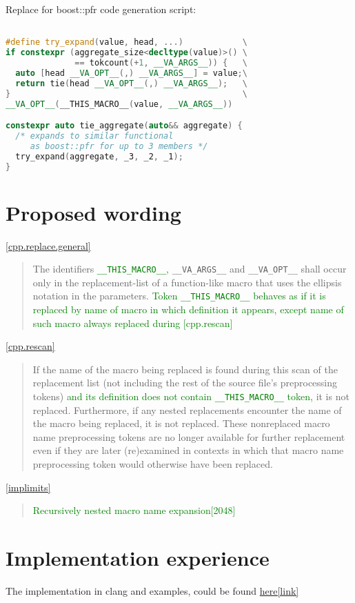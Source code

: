 \documentclass[12pt]{article}
\begin{document}
Replace for boost::pfr code generation script:
\begin{lstlisting}[language=C++]

#define try_expand(value, head, ...)            \
if constexpr (aggregate_size<decltype(value)>() \
              == tokcount(+1, __VA_ARGS__)) {   \
  auto [head __VA_OPT__(,) __VA_ARGS__] = value;\
  return tie(head __VA_OPT__(,) __VA_ARGS__);   \
}                                               \
__VA_OPT__(__THIS_MACRO__(value, __VA_ARGS__))

constexpr auto tie_aggregate(auto&& aggregate) {
  /* expands to similar functional
     as boost::pfr for up to 3 members */
  try_expand(aggregate, _3, _2, _1);
}

\end{lstlisting}

\newpage

\section{Proposed wording}

\href{https://eel.is/c++draft/cpp#replace.general-6}{[cpp.replace.general]}

\begin{quote}
The identifiers \textcolor{green}{ \lstinline{__THIS_MACRO__},}
\lstinline{__VA_ARGS__} and \lstinline{__VA_OPT__}
shall occur only in the replacement-list
of a function-like macro that uses
the ellipsis notation in the parameters.
\textcolor{green}{Token \lstinline{__THIS_MACRO__}
behaves as if it is replaced by name of macro
in which definition it appears, except name
of such macro always replaced during [cpp.rescan]}
\end{quote}

\bigskip

\href{https://eel.is/c++draft/cpp#rescan-3}{[cpp.rescan]}

\begin{quote}
If the name of the macro being replaced is found during this scan of the replacement list (not including the rest of the source file's preprocessing tokens)
\textcolor{green}{and its definition does not contain \lstinline{__THIS_MACRO__} token, }
it is not replaced. Furthermore, if any nested replacements encounter the name of the macro being replaced, it is not replaced. These nonreplaced macro name preprocessing tokens are no longer available for further replacement even if they are later (re)examined in contexts in which that macro name preprocessing token would otherwise have been replaced.
\end{quote}

\href{https://eel.is/c++draft/#implimits}{[implimits]}
\begin{quote}
\textcolor{green}{Recursively nested macro name expansion[2048]}
\end{quote}

\section{Implementation experience}

The implementation in clang and examples,
could be found \href{https://github.com/llvm/llvm-project/pull/65851}{here[link]}
\end{document}
